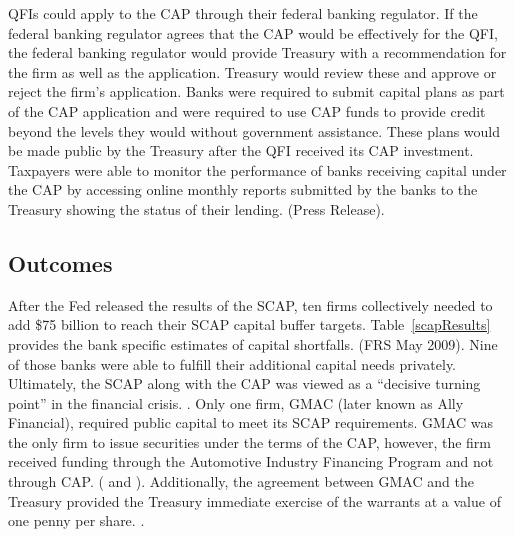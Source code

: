 \documentclass[12pt]{article}
\begin{document}
QFIs could apply to the CAP through their federal banking regulator. If the federal banking regulator agrees that the CAP would be effectively for the QFI, the federal banking regulator would provide Treasury with a recommendation for the firm as well as the application. Treasury would review these and approve or reject the firm's application. Banks were required to submit capital plans as part of the CAP application and were required to use CAP funds to provide credit beyond the levels they would without government assistance. These plans would be made public by the Treasury after the QFI received its CAP investment. Taxpayers were able to monitor the performance of banks receiving capital under the CAP by accessing online monthly reports submitted by the banks to the Treasury showing the status of their lending. (Press Release).


\subsection{Outcomes}

After the Fed released the results of the SCAP, ten firms collectively needed to add \$75 billion to reach their SCAP capital buffer targets. Table~\ref{scapResults} provides the bank specific estimates of capital shortfalls. (FRS May 2009). Nine of those banks were able to fulfill their additional capital needs privately. Ultimately, the SCAP along with the CAP was viewed as a “decisive turning point'' in the financial crisis. \citep{Bernanke}. Only one firm, GMAC (later known as Ally Financial), required public capital to meet its SCAP requirements. GMAC was the only firm to issue securities under the terms of the CAP, however, the firm received funding through the Automotive Industry Financing Program and not through CAP. (\citet{OFS} and \citet{GW}). Additionally, the agreement between GMAC and the Treasury provided the Treasury immediate exercise of the warrants at a value of one penny per share. \citep{GW}.
\end{document}
